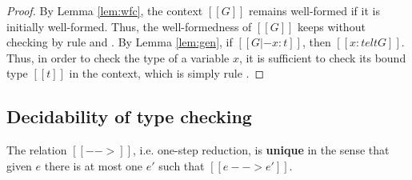 \begin{proof}
	By Lemma \ref{lem:wfc}, the context $[[G]]$ remains well-formed if it is initially well-formed. Thus, the well-formedness of $[[G]]$ keeps without checking by rule  and . By Lemma \ref{lem:gen}, if $[[G |- x:t]]$, then $[[x:t elt G]]$. Thus, in order to check the type of a variable $x$, it is sufficient to check its bound type $[[t]]$ in the context, which is simply rule .
\end{proof}

\subsection{Decidability of type checking}
\begin{lem}\label{lem:unired}
	The relation $[[-->]]$, i.e. one-step reduction, is \textbf{unique} in the sense that given $e$ there is at most one $e'$ such that $[[e --> e']]$.
\end{lem}


